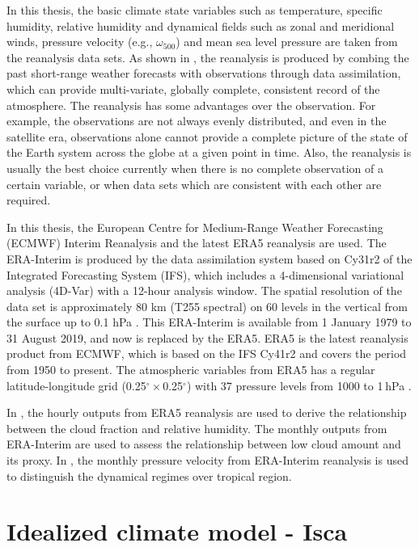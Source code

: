In this thesis, the basic climate state variables such as temperature, specific humidity, relative humidity and dynamical fields such as zonal and meridional winds, pressure velocity (e.g., $\omega_{500}$) and mean sea level pressure are taken from the reanalysis data sets. As shown in , the reanalysis is produced by combing the past short-range weather forecasts with observations through data assimilation, which can provide multi-variate, globally complete, consistent record of the atmosphere. The reanalysis has some advantages over the observation. For example, the observations are not always evenly distributed, and even in the satellite era, observations alone cannot provide a complete picture of the state of the Earth system across the globe at a given point in time. Also, the reanalysis is usually the best choice currently  when there is no complete observation of a certain variable, or when data sets which are consistent with each other are required.

In this thesis, the European Centre for Medium-Range Weather Forecasting (ECMWF) Interim Reanalysis \citep[ERA-Interim;][]{Dee2011} and the latest ERA5 \citep{era5} reanalysis are used. The ERA-Interim is produced by the data assimilation system based on Cy31r2 of the Integrated Forecasting System (IFS), which includes a 4-dimensional variational analysis (4D-Var) with a 12-hour analysis window. The spatial resolution of the data set is approximately 80 km (T255 spectral) on 60 levels in the vertical from the surface up to 0.1 hPa \citep{Dee2011}. This ERA-Interim is available from 1 January 1979 to 31 August 2019, and now is replaced by the ERA5. ERA5 is the latest reanalysis product from ECMWF, which is based on the IFS Cy41r2 and covers the period from 1950 to present. The atmospheric variables from ERA5 has a regular latitude-longitude grid (0.25$^\circ \times$0.25$^\circ$) with 37 pressure levels from 1000 to 1 hPa \citep{Hersbach2020era5}.

In , the hourly outputs from ERA5 reanalysis are used to derive the relationship between the cloud fraction and relative humidity. The monthly outputs from ERA-Interim are used to assess the relationship between low cloud amount and its proxy. In , the monthly pressure velocity from ERA-Interim reanalysis is used to distinguish the dynamical regimes over tropical region.

\section{Idealized climate model - Isca}
\label{sec:isca_intro}

